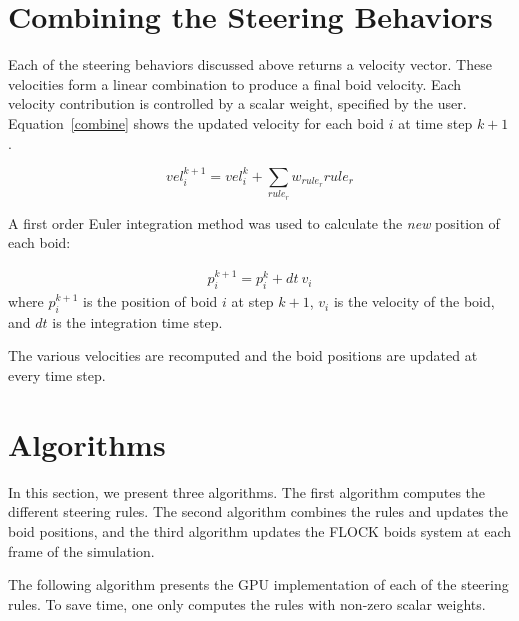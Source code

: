 \section{Combining the Steering Behaviors}
Each of the steering behaviors discussed above returns a velocity vector. These velocities form a linear combination to produce a final boid velocity. Each velocity contribution is controlled by a scalar weight, specified by the user. Equation~\ref{combine} shows the updated velocity for each boid $i$ at time step $k+1$.

\begin{equation}
\label{combine}
vel_i^{k+1} = vel_i^{k} + \sum_{rule_r} w_{rule_r} {rule_r} 
\end{equation}

A first order Euler integration method was used  to calculate the \textit{new} position of each boid: 

\begin{align}
\label{integrate}
p_i^{k+1} = p_i^k + dt~ v_i
\end{align}
where $p_i^{k+1}$ is the position of boid $i$ at step $k+1$, $v_i$ is the velocity of the boid, and $dt$ is the integration time step. 

The various velocities are recomputed and the boid positions are updated at every time step. 

\section{Algorithms}
In this section, we present three algorithms. The first algorithm computes the different steering rules. The second algorithm combines the rules and updates the boid positions, and the third algorithm updates the FLOCK boids system at each frame of the simulation. 

The following algorithm presents the GPU implementation of each of the steering rules. To save time, one only computes the rules with non-zero scalar weights. 

